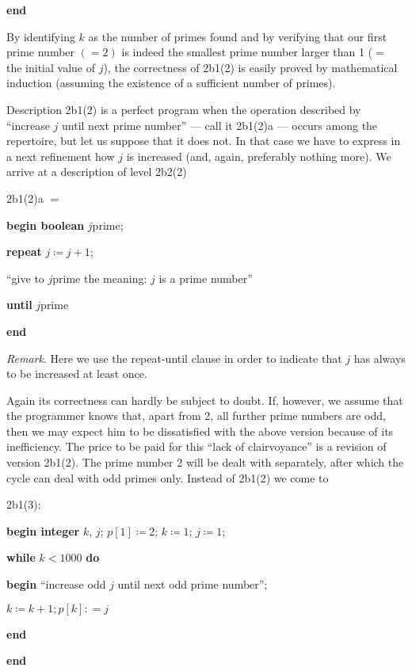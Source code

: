 \noindent
\textbf{end}

By identifying $k$ as the number of primes found and by verifying that our first prime number $(=2)$ is indeed the smallest prime number larger than 1 ($=$ the initial value of $j$), the correctness of 2b1(2) is easily proved by mathematical induction (assuming the existence of a sufficient number of primes).

Description 2b1(2) is a perfect program when the operation described by ``increase $j$ until next prime number'' --- call it 2b1(2)a --- occurs among the repertoire, but let us suppose that it does not. In that case we have to express in a next refinement how $j$ is increased (and, again, preferably nothing more). We arrive at a description of level 2b2(2)

\noindent
2b1(2)a $=$

\noindent
\textbf{begin boolean} $j$prime;

\noindent
\quad \textbf{repeat} $j \coloneq j + 1$;

\noindent
\quad\quad  ``give to $j$prime the meaning: $j$ is a prime number''

\noindent
\quad \textbf{until} $j$prime

\noindent
\textbf{end}

\noindent
\textit{Remark}. Here we use the repeat-until clause in order to indicate that $j$ has always to be increased at least once.

Again its correctness can hardly be subject to doubt. If, however, we assume that the programmer knows that, apart from 2, all further prime numbers are odd, then we may expect him to be dissatisfied with the above version because of its inefficiency. The price to be paid for this ``lack of clairvoyance'' is a revision of version 2b1(2). The prime number 2 will be dealt with separately, after which the cycle can deal with odd primes only. Instead of 2b1(2) we come to

\noindent
2b1(3):

\noindent
\textbf{begin integer} $k$, $j$; $p[1] \coloneq 2$; $k \coloneq 1$; $j \coloneq 1$;

\noindent
\quad\textbf{while} $k < 1000$ \textbf{do}

\noindent
\quad\quad\textbf{begin} ``increase odd $j$ until next odd prime number'';

\noindent
\quad\quad\quad $k \coloneq k + 1; p[k]: = j$

\noindent
\quad\quad\textbf{end}

\noindent
\textbf{end}

